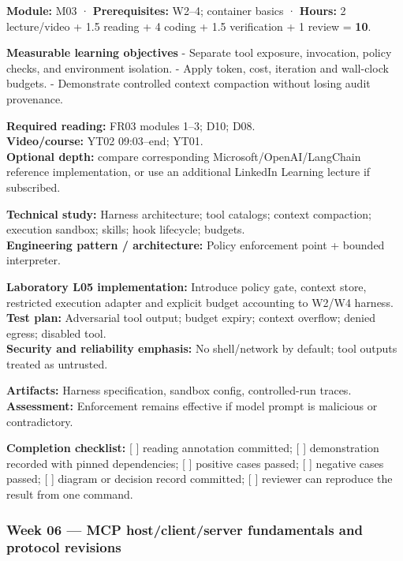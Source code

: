 \documentclass[
  10pt,
]{article}
\begin{document}
\textbf{Module:} M03 · \textbf{Prerequisites:} W2--4; container basics ·
\textbf{Hours:} 2 lecture/video + 1.5 reading + 4 coding + 1.5
verification + 1 review = \textbf{10}.

\textbf{Measurable learning objectives} - Separate tool exposure,
invocation, policy checks, and environment isolation. - Apply token,
cost, iteration and wall-clock budgets. - Demonstrate controlled context
compaction without losing audit provenance.

\textbf{Required reading:} FR03 modules 1--3; D10; D08.\\
\textbf{Video/course:} YT02 09:03--end; YT01.\\
\textbf{Optional depth:} compare corresponding
Microsoft/OpenAI/LangChain reference implementation, or use an
additional LinkedIn Learning lecture if subscribed.

\textbf{Technical study:} Harness architecture; tool catalogs; context
compaction; execution sandbox; skills; hook lifecycle; budgets.\\
\textbf{Engineering pattern / architecture:} Policy enforcement point +
bounded interpreter.

\textbf{Laboratory L05 implementation:} Introduce policy gate, context
store, restricted execution adapter and explicit budget accounting to
W2/W4 harness.\\
\textbf{Test plan:} Adversarial tool output; budget expiry; context
overflow; denied egress; disabled tool.\\
\textbf{Security and reliability emphasis:} No shell/network by default;
tool outputs treated as untrusted.

\textbf{Artifacts:} Harness specification, sandbox config,
controlled-run traces.\\
\textbf{Assessment:} Enforcement remains effective if model prompt is
malicious or contradictory.

\textbf{Completion checklist:} {[} {]} reading annotation committed; {[}
{]} demonstration recorded with pinned dependencies; {[} {]} positive
cases passed; {[} {]} negative cases passed; {[} {]} diagram or decision
record committed; {[} {]} reviewer can reproduce the result from one
command.

\subsubsection{Week 06 --- MCP host/client/server fundamentals and
protocol
revisions}\label{week-06-mcp-hostclientserver-fundamentals-and-protocol-revisions}
\end{document}
